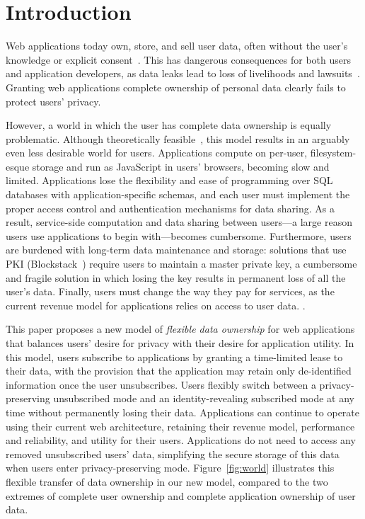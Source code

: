 \section{Introduction}

Web applications today own, store, and sell user data, often without the user's knowledge or
explicit consent~\cite{nytimes:fb, npr:data}. This has dangerous consequences for both users and
application developers, as data leaks lead to loss of livelihoods and
lawsuits~\cite{breach:amazon,breach:twitter, breach:fb, breach:marriott, breach:quora}. Granting web
applications complete ownership of personal data clearly fails to protect users' privacy. 

However, a world in which the user has complete data ownership is equally problematic. Although
theoretically feasible~\cite{amber, w5, blockstack, bstore}, this model results in an arguably even
less desirable world for users. 
%
Applications compute on per-user, filesystem-esque storage and run as JavaScript in users' browsers,
becoming slow and limited. Applications lose the flexibility and ease of programming over SQL
databases with application-specific schemas, and each user must implement the proper access control
and authentication mechanisms for data sharing.  As a result, service-side computation and data
sharing between users---a large reason users use applications to begin with---becomes cumbersome.
Furthermore, users are burdened with long-term data maintenance and storage: solutions that use PKI
(\eg Blockstack~\cite{blockstack}) require users to maintain a master private key, a cumbersome and
fragile solution in which losing the key results in permanent loss of all the user's data.
%
Finally, users must change the way they pay for services, as the current revenue model for
applications relies on access to user data. 
.

This paper proposes a new model of \emph{flexible data ownership} for web applications that balances
users' desire for privacy with their desire for application utility. In this model, users subscribe
to applications by granting a time-limited lease to their data, with the provision that the
application may retain only de-identified information once the user unsubscribes. Users flexibly
switch between a privacy-preserving unsubscribed mode and an identity-revealing subscribed mode at
any time without permanently losing their data. Applications can continue to operate using their
current web architecture, retaining their revenue model, performance and reliability, and utility
for their users. Applications do not need to access any removed unsubscribed users' data,
simplifying the secure storage of this data when users enter privacy-preserving mode.
Figure~\ref{fig:world} illustrates this flexible transfer of data ownership in our new model,
compared to the two extremes of complete user ownership and complete application ownership of user
data.

